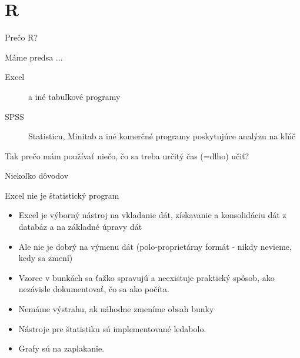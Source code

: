 \section{R}
\begin{frame}{Prečo R?}
	\begin{block}{Máme predsa ...}
		\begin{description}
			\item[Excel] a iné tabuľkové programy
			\item[SPSS] Statisticu, Minitab a iné komerčné programy poskytujúce analýzu na kľúč
		\end{description}
		\alert{Tak prečo mám používať niečo, čo sa treba určitý čas (=dlho) učiť?}
	\end{block}
\end{frame}

\begin{frame}{Niekoľko dôvodov}
	\begin{block}{Excel nie je štatistický program}
		\begin{itemize}
			\item Excel je výborný nástroj na vkladanie dát, získavanie a konsolidáciu dát z databáz a na základné úpravy dát
			\item Ale nie je dobrý na výmenu dát (polo-proprietárny formát - nikdy nevieme, kedy sa zmení)
			\item Vzorce v bunkách sa ťažko spravujú a neexistuje praktický spôsob, ako nezávisle dokumentovať, čo sa ako počíta.
			\item Nemáme výstrahu, ak náhodne zmeníme obsah bunky
			\item Nástroje pre štatistiku sú implementované ledabolo.
			\item Grafy sú na zaplakanie.
		\end{itemize}
	\end{block}
\end{frame}

